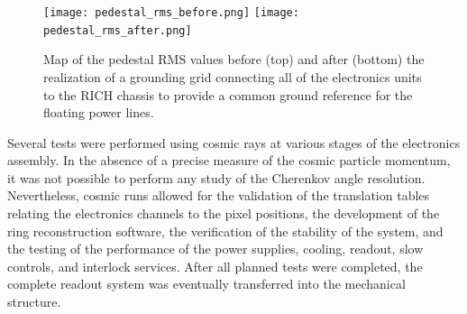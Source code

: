 \documentclass[5p,times,twocolumn]{elsarticle}
\begin{document}
\begin{figure}[t]
\begin{center}
\texttt{[image: pedestal\_rms\_before.png]}
\texttt{[image: pedestal\_rms\_after.png]}
\end{center}
\caption{Map of the pedestal RMS values before (top) and after (bottom) the realization of a grounding grid
  connecting all of the electronics units to the RICH chassis to provide a common ground reference for the floating
  power lines.}
\label{fig:GroundG}
\end{figure}

Several tests were performed using cosmic rays at various stages of the electronics assembly.
In the absence of a precise measure of the cosmic particle momentum, it was not possible to perform any study of
the Cherenkov angle resolution. Nevertheless, cosmic runs allowed for the validation of the translation tables relating
the electronics channels to the pixel positions, the development of the ring reconstruction software, the verification of
the stability of the system, and the testing of the performance of the power supplies, cooling, readout, slow controls,
and interlock services. After all planned tests were completed, the complete readout system was eventually transferred
into the mechanical structure.
\end{document}
